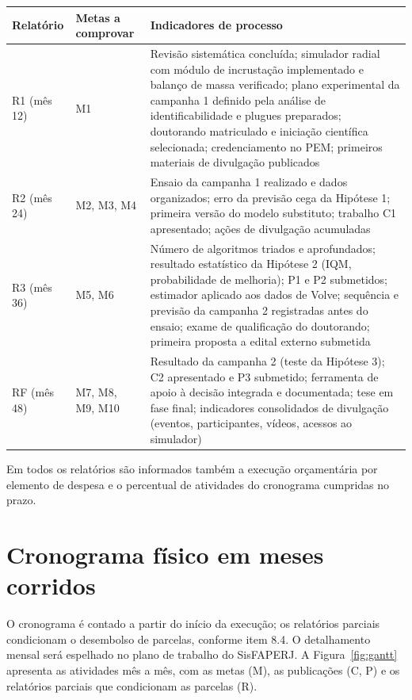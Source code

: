 \documentclass[10pt,a4paper]{article}
\newcommand{\itemedital}[1]{}
\begin{document}
{\small{}
\begin{longtable}{@{}>{\raggedright\arraybackslash}p{}>{\raggedright\arraybackslash}p{}>{\raggedright\arraybackslash}p{}@{}}
\toprule
\textbf{Relatório} & \textbf{Metas a comprovar} & \textbf{Indicadores de processo} \\
\midrule
\endhead
R1 (mês 12) & M1 & Revisão sistemática concluída; simulador radial com módulo de incrustação implementado e balanço de massa verificado; plano experimental da campanha 1 definido pela análise de identificabilidade e plugues preparados; doutorando matriculado e iniciação científica selecionada; credenciamento no PEM; primeiros materiais de divulgação publicados \\
R2 (mês 24) & M2, M3, M4 & Ensaio da campanha 1 realizado e dados organizados; erro da previsão cega da Hipótese 1; primeira versão do modelo substituto; trabalho C1 apresentado; ações de divulgação acumuladas \\
R3 (mês 36) & M5, M6 & Número de algoritmos triados e aprofundados; resultado estatístico da Hipótese 2 (IQM, probabilidade de melhoria); P1 e P2 submetidos; estimador aplicado aos dados de Volve; sequência e previsão da campanha 2 registradas antes do ensaio; exame de qualificação do doutorando; primeira proposta a edital externo submetida \\
RF (mês 48) & M7, M8, M9, M10 & Resultado da campanha 2 (teste da Hipótese 3); C2 apresentado e P3 submetido; ferramenta de apoio à decisão integrada e documentada; tese em fase final; indicadores consolidados de divulgação (eventos, participantes, vídeos, acessos ao simulador) \\
\bottomrule
\end{longtable}
}

\noindent Em todos os relatórios são informados também a execução orçamentária por
elemento de despesa e o percentual de atividades do cronograma cumpridas no prazo.

\section{Cronograma físico em meses corridos}\itemedital{2.16 XIV; Anexo 1 II.II-g}
O cronograma é contado a partir do início da execução; os relatórios parciais condicionam o desembolso de parcelas, conforme item 8.4. O detalhamento mensal será espelhado no plano de trabalho do SisFAPERJ.
A Figura~\ref{fig:gantt} apresenta as atividades mês a mês, com as metas (M), as publicações (C, P) e os relatórios parciais que condicionam as parcelas (R).
\end{document}
